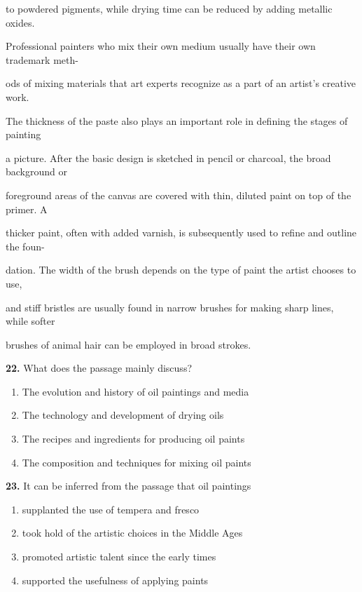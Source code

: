 \documentclass[12pt]{article}
\begin{document}
to powdered pigments, while drying time can be reduced by adding metallic oxides.\par
Professional painters who mix their own medium usually have their own trademark meth-\par
ods of mixing materials that art experts recognize as a part of an artist's creative work.\par
The thickness of the paste also plays an important role in defining the stages of painting\par
a picture. After the basic design is sketched in pencil or charcoal, the broad background or\par
foreground areas of the canvas are covered with thin, diluted paint on top of the primer. A\par
thicker paint, often with added varnish, is subsequently used to refine and outline the foun-\par
dation. The width of the brush depends on the type of paint the artist chooses to use,\par
and stiff bristles are usually found in narrow brushes for making sharp lines, while softer\par
brushes of animal hair can be employed in broad strokes.\par
\endgroup
\medskip
\noindent\textbf{22.} What does the passage mainly discuss?
\begin{enumerate}[label=(\Alph*),leftmargin=*,itemsep=0.2em]
\item The evolution and history of oil paintings and media
\item The technology and development of drying oils
\item The recipes and ingredients for producing oil paints
\item The composition and techniques for mixing oil paints
\end{enumerate}
\par
\vspace{0.25\baselineskip}
\noindent\textbf{23.} It can be inferred from the passage that oil paintings
\begin{enumerate}[label=(\Alph*),leftmargin=*,itemsep=0.2em]
\item supplanted the use of tempera and fresco
\item took hold of the artistic choices in the Middle Ages
\item promoted artistic talent since the early times
\item supported the usefulness of applying paints
\end{enumerate}
\end{document}
